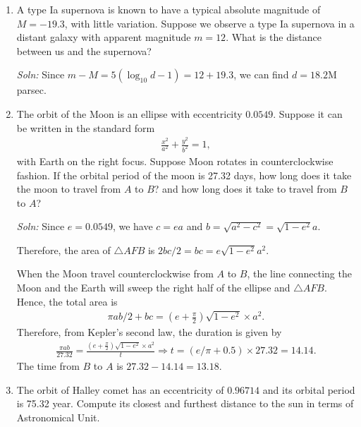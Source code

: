 \documentclass{article}
\begin{document}
\begin{enumerate}
\newpage
\item A type Ia supernova is known to have a typical absolute magnitude of $M = -19.3$, with little variation. Suppose we observe a type Ia supernova in a distant galaxy with apparent magnitude $m=12$. What is the distance between us and the supernova?

  \emph{Soln:} Since $m-M = 5(\log_{10}d-1) = 12+19.3$, we can find $d = 18.2$M parsec.

\item  The orbit of the Moon is an ellipse with eccentricity $0.0549$. Suppose it can be written in the standard form
  \begin{align*}
    \frac{x^2}{a^2}+\frac{y^2}{b^2} = 1,
  \end{align*}
   with Earth on the right focus. Suppose Moon rotates in counterclockwise fashion. If the orbital period of the moon is 27.32 days, how long does it take the moon to travel from $A$ to $B$? and how long does it take to travel from $B$ to $A$?

  \begin{figure}[ht]
    \centering
  \end{figure}
\emph{Soln:} Since $e = 0.0549$, we have $c = e a$ and $b = \sqrt{a^2-c^2} = \sqrt{1-e^2}a$.

Therefore, the area of $\triangle AFB$ is $2bc/2 = bc = e\sqrt{1-e^2}a^2$.

When the Moon travel counterclockwise from $A$ to $B$, the line connecting the Moon and the Earth will sweep the right half of the ellipse and $\triangle AFB$. Hence, the total area is 
\begin{align*}
  \pi ab /2 + bc = \left(e+\frac{\pi}{2}\right)\sqrt{1-e^2}\times a^2.
\end{align*}
Therefore, from Kepler's second law, the duration is given by
\begin{align*}
  \frac{\pi ab}{27.32} = \frac{\left(e+\frac{\pi}{2}\right)\sqrt{1-e^2}\times a^2}{t}\Rightarrow t = (e/\pi + 0.5)\times 27.32 = 14.14.
\end{align*}
The time from $B$ to $A$ is $27.32 - 14.14 = 13.18$.
\newpage
\item The orbit of Halley comet has an eccentricity of $0.96714$ and its orbital period is 75.32 year. Compute its closest and furthest distance to the sun in terms of Astronomical Unit.


\end{enumerate}
\end{document}
